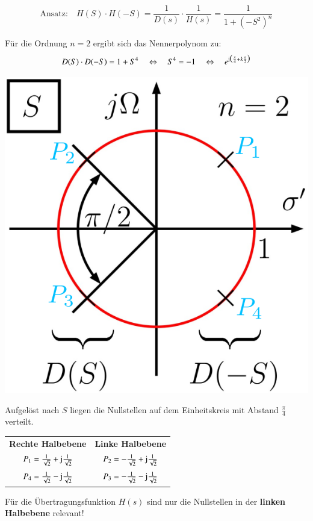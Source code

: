 
$$ \text{Ansatz:} \quad H(S) \cdot H(-S) = \frac{1}{D(s)} \cdot \frac{1}{H(s)} = \frac{1}{ 1 + (-S^2)^n} $$

Für die Ordnung $n = 2$ ergibt sich das Nennerpolynom zu:
$$ D(S) \cdot D(-S) = 1 + S^4 \quad \Leftrightarrow \quad S^4 = -1 \quad \Leftrightarrow \quad
    e^{\mathrm{j} \bigl( \frac{\pi}{4} + k \frac{\pi}{2} \bigr)}$$

\begin{minipage}[c]{0.3\columnwidth}
    \includegraphics[width=\columnwidth]{images/filter_butterworth_pollagen_ordnung_2.png}
\end{minipage}
\hfill
\begin{minipage}[c]{0.58\columnwidth}
    Aufgelöst nach $S$ liegen die Nullstellen auf dem Einheitskreis mit Abstand $\frac{\pi}{4}$ verteilt.
    \vspace{0.2cm}

    \renewcommand{\arraystretch}{1.3}
    \begin{tabular}{c c}
        \textbf{Rechte Halbebene}                             & \textbf{Linke Halbebene} \\
        $P_1 = \frac{1}{\sqrt{2}} + \mathrm{j} \frac{1}{\sqrt{2}}$ & $P_2 = - \frac{1}{\sqrt{2}} + \mathrm{j} \frac{1}{\sqrt{2}}$ \\
        $P_4 = \frac{1}{\sqrt{2}} - \mathrm{j} \frac{1}{\sqrt{2}}$ & $P_3 = - \frac{1}{\sqrt{2}} - \mathrm{j} \frac{1}{\sqrt{2}}$ \\
    \end{tabular}
    \renewcommand{\arraystretch}{1}

    \vspace{0.2cm}
    \textrightarrow Für die Übertragungsfunktion $H(s)$ sind nur die Nullstellen in der \textbf{linken Halbebene} relevant!
\end{minipage}

